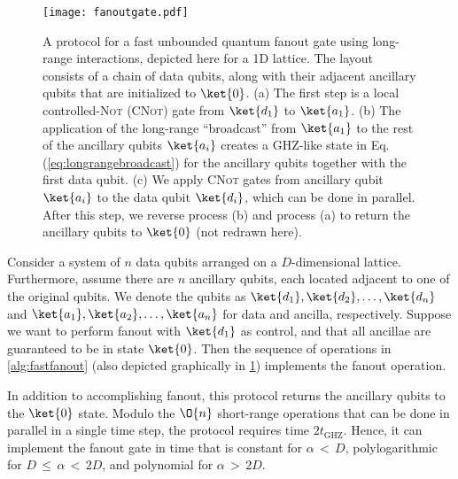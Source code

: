 \begin{figure}[t]
  \begin{centering}
    \texttt{[image: fanoutgate.pdf]}
  \par\end{centering}
  \caption{A protocol for a fast unbounded quantum fanout gate using long-range interactions, depicted here for a 1D lattice.
  The layout consists of a chain of data qubits, along with their adjacent ancillary qubits that are initialized to $\ket{0}$.
  (a) The first step is a local controlled-\textsc{Not} (\textsc{CNot}) gate from $\ket{d_1}$ to $\ket{a_1}$.
  (b) The application of the long-range ``broadcast'' from $\ket{a_1}$ to the rest of the ancillary qubits $\ket{a_i}$ creates a GHZ-like state in Eq.\,(\ref{eq:longrangebroadcast}) for the ancillary qubits together with the first data qubit.
  (c) We apply \textsc{CNot} gates from ancillary qubit $\ket{a_i}$ to the data qubit $\ket{d_i}$, which can be done in parallel. After this step, we reverse process (b) and process (a) to return the ancillary qubits to $\ket{0}$ (not redrawn here). }
  \label{fig:broadcast}
\end{figure}

Consider a system of $n$ data qubits arranged on a $D$-dimensional lattice.
Furthermore, assume there are $n$ ancillary qubits, each located adjacent to one of the original qubits.
We denote the qubits as $\ket{d_1}, \ket{d_2}, \dots, \ket{d_n}$ and $\ket{a_1}, \ket{a_2}, \dots, \ket{a_n}$ for data and ancilla, respectively.
Suppose we want to perform fanout with $\ket{d_1}$ as control, and that all ancillae are guaranteed to be in state $\ket{0}$.
Then the sequence of operations in \cref{alg:fastfanout} (also depicted graphically in \cref{fig:broadcast}) implements the fanout operation.

In addition to accomplishing fanout, this protocol returns the ancillary qubits to the $\ket{0}$ state.
Modulo the $\O{n}$ short-range operations that can be done in parallel in a single time step, the protocol requires time $2 t_\mathrm{GHZ}$.
Hence, it can implement the fanout gate in time that is constant for $\alpha$\,$<$\,$D$, polylogarithmic for $D$\,$\le$\,$\alpha$\,$<$\,$2D$, and polynomial for $\alpha$\,$>$\,$2D$.

